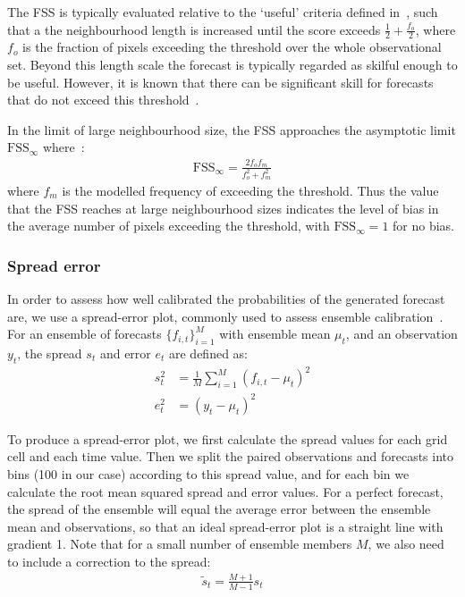 \documentclass{article}
\begin{document}
The FSS is typically evaluated relative to the `useful' criteria defined in~\cite{roberts_scale-selective_2008}, such that a the neighbourhood length is increased until the score exceeds $\frac{1}{2} + \frac{f_o}{2}$, where $f_o$ is the fraction of pixels exceeding the threshold over the whole observational set. Beyond this length scale the forecast is typically regarded as skilful enough to be useful. However, it is known that there can be significant skill for forecasts that do not exceed this threshold~\citep{nachamkin_applying_2015, mittermaier_long-term_2013}. 

In the limit of large neighbourhood size, the FSS approaches the asymptotic limit $\text{FSS}_{\infty}$ where~\citep{roberts_scale-selective_2008}:
\begin{align}
\text{FSS}_{\infty} = \frac{2 f_of_m}{ f_o^2 + f_m^2}
\end{align}
where $f_m$ is the modelled frequency of exceeding the threshold. Thus the value that the FSS reaches at large neighbourhood sizes indicates the level of bias in the average number of pixels exceeding the threshold, with $\text{FSS}_{\infty}=1$ for no bias.

\subsubsection{Spread error}
\label{sec:spread_err}
In order to assess how well calibrated the probabilities of the generated forecast are, we use a spread-error plot, commonly used to assess ensemble calibration~\citep{leutbecher_ensemble_2008}. For an ensemble of forecasts $\{f_{i,t}\}_{i=1}^M$ with ensemble mean $\mu_t$, and an observation $y_t$, the spread $s_t$ and error $e_t$ are defined as:
\begin{align}
    s_t^2 &= \frac{1}{M} \sum_{i=1}^{M} \left( f_{i,t} - \mu_t \right)^2 \\
    e_t^2 &= ( y_t - \mu_t )^2
\end{align}

To produce a spread-error plot, we first calculate the spread values for each grid cell and each time value. Then we split the paired observations and forecasts into bins (100 in our case) according to this spread value, and for each bin we calculate the root mean squared spread and error values. 
 For a perfect forecast, the spread of the ensemble will equal the average error between the ensemble mean and observations, so that an ideal spread-error plot is a straight line with gradient 1. Note that for a small number of ensemble members $M$, we also need to include a correction to the spread:
\begin{align}
    \tilde{s}_t = \frac{M+1}{M-1} s_t
\end{align}
\end{document}
